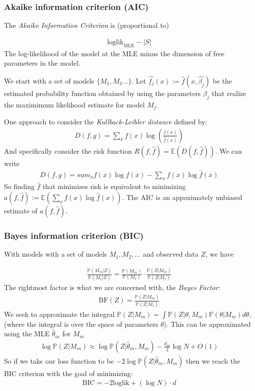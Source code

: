 \documentclass[12pt]{article}
\newcommand{\PP}{\ensuremath{\mathbb{P}}}
\begin{document}
\subsubsection{Akaike information criterion (AIC)}

The {\sl Akaike Information Criterion} is (proportional to)

\begin{align*}
  \text{loglik}_{\text{MLE}} - |S|
\end{align*}
The log-likelihood of the model at the MLE minus the dimension of free
parameters in the model.

We start with a set of models $\{M_1, M_2  \ldots \}$. Let $\widehat{f_j}(x) :=
\hat f(x , \widehat{\beta_j})$ be
the estimated probability function obtained by using the parameters $\beta_j$
that realize the maximimum likelihood estimate for model $M_j$.

One approach \cite[\S13.9]{wasserman} to consider the {\sl Kullback-Leibler
  distance} defined by:
\begin{align*}
  D(f,g) = \sum_x f(x) \log\left(\frac{f(x)}{\hat f(x)} \right)
\end{align*}
And specifically consider the risk function $R(f,\hat f) = \mathbb{E}(D(f,\hat
f))$. We can write
\begin{align*}
  D(f,g ) =sum_x f(x) \log f(x)  - \sum_x f(x)\log \hat f(x)
\end{align*}
So finding $\hat f$ that minimizes risk is equivalent to minimizing $a(f, \hat
f):= \mathbb{E}\left( \sum_x f(x) \log \hat f(x) \right)$. The AIC is an
appoximately unbiased estimate of $a(f,\hat f)$.

\subsubsection{Bayes information criterion (BIC)}

With models with a set of models $M_1,M_2, \ldots $ and observed data $Z$, we
have

\begin{align*}
\frac{ \PP (M_m | Z) }{\PP(M_\ell|Z)} = \frac{\PP(M_m)}{\PP(M_\ell)} \cdot \frac{\PP(Z | M_m)}{\PP(Z | M_\ell)} 
\end{align*}
The rightmost factor is what we are concerned with, the {\sl Bayes Factor}:
\begin{align*}
  \text{BF}(Z) = \frac{\PP(Z | M_m)}{\PP(Z | M_\ell)} 
\end{align*}
We seek to approximate the integral $\PP(Z | M_m) = \displaystyle\int \PP(Z | \theta,M_m)
\PP(\theta |M_m) d\theta$, (where the integral is over the space of parameters
$\theta$). This can be approximated using the MLE $\hat \theta_m$ for $M_m$
\begin{align*}
  \log \PP(Z |M_m) \approx \log \PP(Z | \hat \theta_m, M_m ) - \frac{d_m}{2} \log N + O(1)
\end{align*}
So if we take our loss function to be $-2 \log \PP(Z | \hat \theta_m , M_m)$
then we reach the BIC criterion with the goal of minimizing:
\begin{align*}
  \text{BIC} = -2 \text{loglik} + (\log N )\cdot d
\end{align*}
\end{document}

